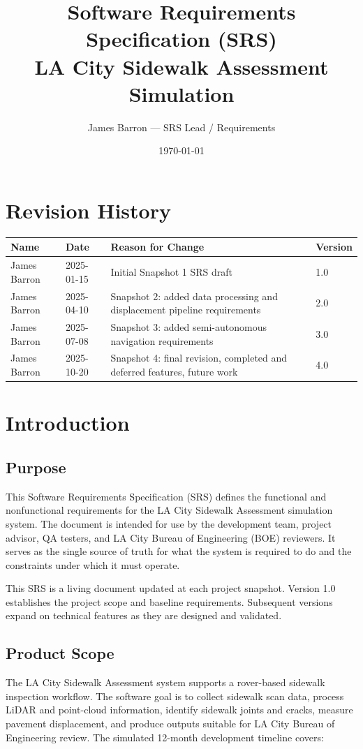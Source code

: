 \documentclass{article}
\title{Software Requirements Specification (SRS)\\
\large LA City Sidewalk Assessment Simulation}
\author{James Barron --- SRS Lead / Requirements}
\date{\today}
\begin{document}
\maketitle
\newpage
\tableofcontents
\newpage


\section{Revision History}


\begin{longtable}{|p{1.3in}|p{1in}|p{2.6in}|p{0.8in}|}
\hline
\textbf{Name} & \textbf{Date} & \textbf{Reason for Change} & \textbf{Version} \\
\hline
James Barron & 2025-01-15 & Initial Snapshot 1 SRS draft & 1.0 \\
\hline
James Barron & 2025-04-10 & Snapshot 2: added data processing and displacement pipeline requirements & 2.0 \\
\hline
James Barron & 2025-07-08 & Snapshot 3: added semi-autonomous navigation requirements & 3.0 \\
\hline
James Barron & 2025-10-20 & Snapshot 4: final revision, completed and deferred features, future work & 4.0 \\
\hline
\end{longtable}


\section{Introduction}


\subsection{Purpose}
This Software Requirements Specification (SRS) defines the functional and nonfunctional requirements
for the LA City Sidewalk Assessment simulation system. The document is intended for use by the
development team, project advisor, QA testers, and LA City Bureau of Engineering (BOE) reviewers.
It serves as the single source of truth for what the system is required to do and the constraints
under which it must operate.

This SRS is a living document updated at each project snapshot. Version 1.0 establishes the project
scope and baseline requirements. Subsequent versions expand on technical features as they are
designed and validated.

\subsection{Product Scope}
The LA City Sidewalk Assessment system supports a rover-based sidewalk inspection workflow. The
software goal is to collect sidewalk scan data, process LiDAR and point-cloud information, identify
sidewalk joints and cracks, measure pavement displacement, and produce outputs suitable for LA City
Bureau of Engineering review. The simulated 12-month development timeline covers:
\end{document}
